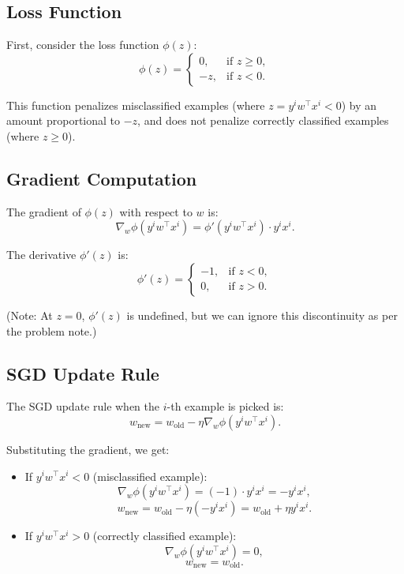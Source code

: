 \documentclass{article}
\begin{document}
\subsection*{Loss Function}

First, consider the loss function $\phi(z)$:
\[
\phi(z) =
\begin{cases}
0, & \text{if } z \geq 0, \\
-z, & \text{if } z < 0.
\end{cases}
\]

This function penalizes misclassified examples (where $z = y^i w^\top x^i < 0$) by an amount proportional to $-z$, and does not penalize correctly classified examples (where $z \geq 0$).

\subsection*{Gradient Computation}

The gradient of $\phi(z)$ with respect to $w$ is:
\[
\nabla_w \phi(y^i w^\top x^i) = \phi'(y^i w^\top x^i) \cdot y^i x^i.
\]

The derivative $\phi'(z)$ is:
\[
\phi'(z) =
\begin{cases}
-1, & \text{if } z < 0, \\
0, & \text{if } z > 0.
\end{cases}
\]

(Note: At $z = 0$, $\phi'(z)$ is undefined, but we can ignore this discontinuity as per the problem note.)

\subsection*{SGD Update Rule}

The SGD update rule when the $i$-th example is picked is:
\[
w_{\text{new}} = w_{\text{old}} - \eta \nabla_w \phi(y^i w^\top x^i).
\]

Substituting the gradient, we get:

\begin{itemize}
\item If $y^i w^\top x^i < 0$ (misclassified example):
\[
\nabla_w \phi(y^i w^\top x^i) = (-1) \cdot y^i x^i = -y^i x^i,
\]
\[
w_{\text{new}} = w_{\text{old}} - \eta (-y^i x^i) = w_{\text{old}} + \eta y^i x^i.
\]

\item If $y^i w^\top x^i > 0$ (correctly classified example):
\[
\nabla_w \phi(y^i w^\top x^i) = 0,
\]
\[
w_{\text{new}} = w_{\text{old}}.
\]
\end{itemize}
\end{document}
